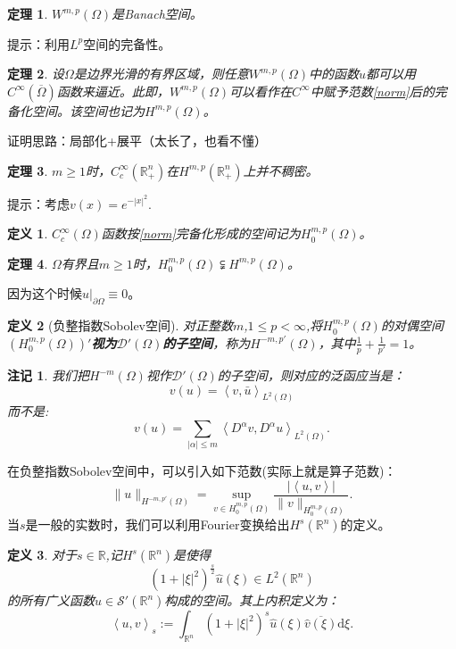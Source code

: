 \documentclass[a4paper]{ctexart}
\newtheorem{Definition}{\hspace{2em}定义}[section]
\newtheorem{Thm}{\hspace{2em}定理}[section]
\newtheorem{rem}{\hspace{2em}注记}[section]
\newcommand{\Rn}{\mathbb{R}^{n}}
\newcommand{\dif}{\mathrm{d}}
\newcommand{\innerprod}[2]{\left<#1,#2\right>}
\begin{document}
\begin{Thm}
    $W^{m,p}(\Omega)$是Banach空间。
\end{Thm}
提示：利用$L^{p}$空间的完备性。

\begin{Thm}
    设$\Omega$是边界光滑的有界区域，则任意$W^{m,p}(\Omega)$中的函数$u$都可以用$C^{\infty}(\overline{\Omega})$函数来逼近。此即，$W^{m,p}(\Omega)$可以看作在$C^{\infty}$中赋予范数\eqref{norm}后的完备化空间。该空间也记为$H^{m,p}(\Omega)$。
\end{Thm}
证明思路：局部化+展平（太长了，也看不懂）
\begin{Thm}
    $m\ge 1$时，$C_{c}^{\infty}(\Rn_{+})$在$H^{m,p}(\Rn_{+})$上并不稠密。
\end{Thm}
提示：考虑$v(x)=e^{-|x|^{2}}$.
\begin{Definition}
    $C_{c}^{\infty}(\Omega)$函数按\eqref{norm}完备化形成的空间记为$H_{0}^{m,p}(\Omega)$。
\end{Definition}
\begin{Thm}
    $\Omega$有界且$m\ge 1$时，$H_{0}^{m,p}(\Omega)\subsetneqq H^{m,p}(\Omega)$。
\end{Thm}
因为这个时候$u|_{\partial\Omega}\equiv 0$。
\begin{Definition}[负整指数Sobolev空间]
    对正整数$m$,$1\le p<\infty$,将$H_{0}^{m,p}(\Omega)$的对偶空间$(H_{0}^{m,p}(\Omega))'$\textbf{视为$\mathcal{D}'(\Omega)$的子空间}，称为$H^{-m,p'}(\Omega)$，其中$\frac{1}{p}+\frac{1}{p'}=1$。
\end{Definition}
\begin{rem}
    我们把$H^{-m}(\Omega)$视作$\mathcal{D}'(\Omega)$的子空间，则对应的泛函应当是：
    \begin{equation}
        v(u)=\innerprod{v}{\bar{u}}_{L^{2}(\Omega)}
    \end{equation}
    而不是:
    \begin{equation}
        v(u)=\sum_{|\alpha|\le m}\innerprod{D^{\alpha}v}{D^{\alpha}u}_{L^{2}(\Omega)}.
    \end{equation}
\end{rem}
在负整指数Sobolev空间中，可以引入如下范数(实际上就是算子范数)：
\begin{equation}
    \|u\|_{H^{-m,p'}(\Omega)}=\sup_{v\in H_{0}^{m,p}(\Omega)}\frac{|\innerprod{u}{v}|}{\|v\|_{H_{0}^{m,p}(\Omega)}}.
\end{equation}
当$s$是一般的实数时，我们可以利用Fourier变换给出$H^{s}(\Rn)$的定义。
\begin{Definition}
    对于$s\in\mathbb{R}$,记$H^{s}(\Rn)$是使得
    \begin{equation}
        (1+|\xi|^{2})^{\frac{s}{2}}\hat{u}(\xi)\in L^{2}(\Rn)
    \end{equation}
    的所有广义函数$u\in\mathscr{S}'(\Rn)$构成的空间。其上内积定义为：
    \begin{equation}
        \innerprod{u}{v}_{s}:=\int_{\Rn}(1+|\xi|^{2})^{s}\hat{u}(\xi)\overline{\hat{v}(\xi)}\dif\xi.
    \end{equation}
\end{Definition}
\end{document}
